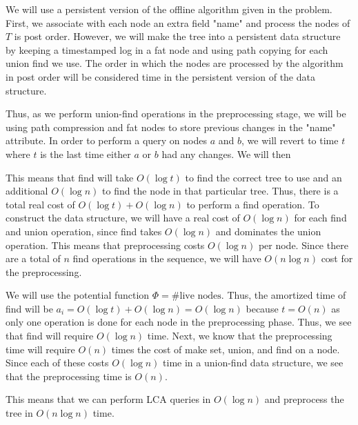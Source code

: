 \documentclass[psamsfonts]{amsart}
\newenvironment{sol}{{\bfseries Solution:}}{\qedsymbol}
\begin{document}
\begin{sol}
We will use a persistent version of the offline algorithm given in the problem. First, we associate with each node an extra field "name" and process the nodes of $T$ is post order. However, we will make the tree into a persistent data structure by keeping a timestamped log in a fat node and using path copying for each union find we use. The order in which the nodes are processed by the algorithm in post order will be considered time in the persistent version of the data structure.

Thus, as we perform union-find operations in the preprocessing stage, we will be using path compression and fat nodes to store previous changes in the "name" attribute. In order to perform a query on nodes $a$ and $b$, we will revert to time $t$ where $t$ is the last time either $a$ or $b$ had any changes. We will then

This means that find will take $O(\log t)$ to find the correct tree to use and an additional $O(\log n)$ to find the node in that particular tree. Thus, there is a total real cost of $O(\log t) + O(\log n)$ to perform a find operation. To construct the data structure, we will have a real cost of $O(\log n)$ for each find and union operation, since find takes $O(\log n)$ and dominates the union operation. This means that preprocessing costs $O(\log n)$ per node. Since there are a total of $n$ find operations in the sequence, we will have $O(n \log n)$ cost for the preprocessing. 

We will use the potential function $\Phi = \text{\# live nodes}$. Thus, the amortized time of find will be $a_i = O(\log t) + O(\log n) = O(\log n)$ because $t = O(n)$ as only one operation is done for each node in the preprocessing phase. Thus, we see that find will require $O(\log n)$ time. Next, we know that the preprocessing time will require $O(n)$ times the cost of make set, union, and find on a node. Since each of these costs $O(\log n)$ time in a union-find data structure, we see that the preprocessing time is $O(n)$.

This means that we can perform LCA queries in $O(\log n)$ and preprocess the tree in $O(n \log n)$ time.
\end{sol}

\end{document}
